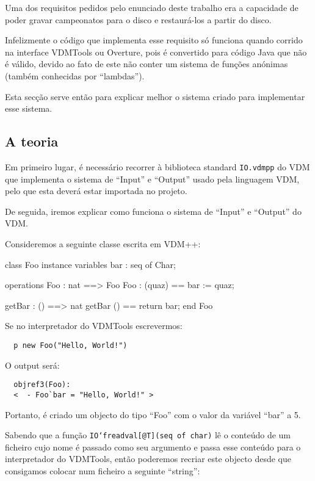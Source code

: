 Uma dos requisitos pedidos pelo enunciado deste trabalho era a
capacidade de poder gravar campeonatos para o disco e restaurá-los a
partir do disco.

Infelizmente o código que implementa esse requisito só funciona quando
corrido na interface VDMTools ou Overture, pois é convertido para
código Java que não é válido, devido ao fato de este não conter um
sistema de funções anónimas (também conhecidas por ``lambdas'').

Esta secção serve então para explicar melhor o sistema criado para
implementar esse sistema.

\subsection{A teoria}

Em primeiro lugar, é necessário recorrer à biblioteca standard
\texttt{IO.vdmpp} do VDM que implementa o sistema de ``Input'' e
``Output'' usado pela linguagem VDM, pelo que esta deverá estar
importada no projeto.

De seguida, iremos explicar como funciona o sistema de ``Input'' e
``Output'' do VDM.

Consideremos a seguinte classe escrita em VDM++:

\begin{vdm_al}
  class Foo
    instance variables
    bar : seq of Char;
    
    operations
    Foo : nat ==> Foo
    Foo : (quaz) ==
      bar := quaz;
  
    getBar : () ==> nat
    getBar () == return bar;
  end Foo
\end{vdm_al}

Se no interpretador do VDMTools escrevermos:

\begin{verbatim}
  p new Foo("Hello, World!")
\end{verbatim}

O output será:

\begin{verbatim}
  objref3(Foo):
  <  - Foo`bar = "Hello, World!" >
\end{verbatim}

Portanto, é criado um objecto do tipo ``Foo'' com o valor da variável
``bar'' a 5.

Sabendo que a função \texttt{IO`freadval[@T](seq of char)} lê o conteúdo
de um ficheiro cujo nome é passado como seu argumento e passa esse
conteúdo para o interpretador do VDMTools, então poderemos recriar
este objecto desde que consigamos colocar num ficheiro a seguinte
``string'':

